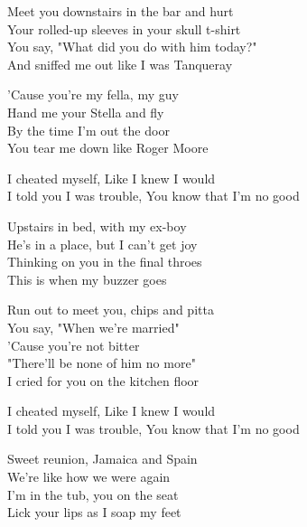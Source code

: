 

Meet you downstairs in the bar and hurt \\
Your rolled-up sleeves in your skull t-shirt \\
You say, "What did you do with him today?" \\
And sniffed me out like I was Tanqueray \\



'Cause you're my fella, my guy \\
Hand me your Stella and fly \\
By the time I'm out the door \\
You tear me down like Roger Moore \\



I cheated myself, Like I knew I would \\
I told you I was trouble, You know that I'm no good \\




Upstairs in bed, with my ex-boy \\
He's in a place, but I can't get joy \\
Thinking on you in the final throes \\
This is when my buzzer goes \\



Run out to meet you, chips and pitta \\
You say, "When we're married" \\
'Cause you're not bitter \\
"There'll be none of him no more" \\
I cried for you on the kitchen floor \\



I cheated myself, Like I knew I would \\
I told you I was trouble, You know that I'm no good \\




Sweet reunion, Jamaica and Spain \\
We're like how we were again \\
I'm in the tub, you on the seat \\
Lick your lips as I soap my feet \\


